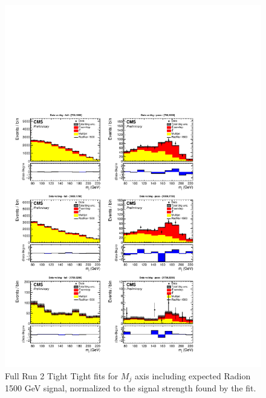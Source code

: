 \begin{figure}[!htb]
	\centering
	\includegraphics[width=1\textwidth]{Figures/postfit_projx_fits_TT.pdf}
	\caption{Full Run 2 Tight Tight fits for $M_j$ axis including expected Radion 1500 GeV signal, normalized to the signal strength found by the fit.}
	\label{fig:TTmj}
\end{figure}
